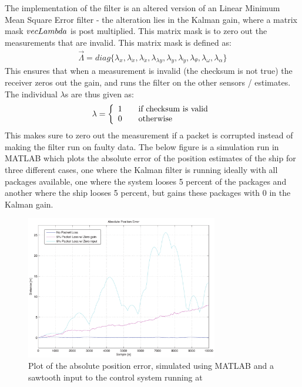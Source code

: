 \documentclass{ifacconf}
\begin{document}
The implementation of the filter is an altered version of an Linear Minimum Mean Square Error filter - the alteration lies in the Kalman gain, where a matrix mask $\\vec{Lambda}$ is post multiplied. This matrix mask is to zero out the measurements that are invalid. This matrix mask is defined as:
\begin{align}
\vec{\Lambda} = diag\{\lambda_x,\lambda_{\dot{x}},\lambda_{\ddot{x}},\lambda_{\lambda{y}},\lambda_{\dot{y}},\lambda_{\ddot{y}},\lambda_{\theta},\lambda_{\omega},\lambda_{\alpha} \}
\end{align}
This ensures that when a measurement is invalid (the checksum is not true) the receiver zeros out the gain, and runs the filter on the other sensors / estimates. The individual $\lambda$s are thus given as:
\begin{align}
\lambda = 
\left\{
  \begin{array}{l l}
    1 & \quad \text{if checksum is valid}\\
    0 & \quad \text{otherwise}
  \end{array} \right.
\end{align} 
This makes sure to zero out the measurement if a packet is corrupted instead of making the filter run on faulty data. The below figure is a simulation run in MATLAB which plots the absolute error of the position estimates of the ship for three different cases, one where the Kalman filter is running ideally with all packages available, one where the system looses 5 percent of the packages and another where the ship looses 5 percent, but gains these packages with 0 in the Kalman gain. 
\begin{figure}
	\begin{center}
		\includegraphics[width=8.4cm]{img/abspos}    %
		\caption{Plot of the absolute position error, simulated using MATLAB and a sawtooth input to the control system running at }  %
		\label{fig:3points}               
	\end{center}                                 %
\end{figure}
\end{document}
